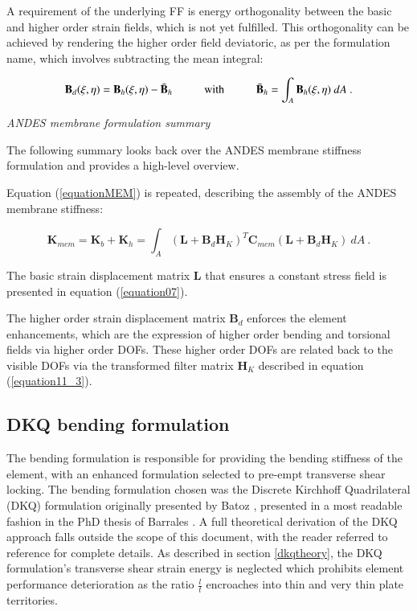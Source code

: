 A requirement of the underlying FF is energy orthogonality between the basic and higher order strain fields, which is not yet fulfilled. This orthogonality can be achieved by rendering the higher order field deviatoric, as per the formulation name, which involves subtracting the mean integral:

\begin{equation} 
\mathbf{B}_d(\xi,\eta) = \mathbf{B}_h(\xi,\eta) - \bar{\mathbf{B}}_h
\hspace{10mm}
\text{with}
\hspace{10mm}
\bar{\mathbf{B}}_h = \int_A \mathbf{B}_h(\xi,\eta) \ dA
\label{eqnAndesDevB}\ .
\end{equation}

\textit{ANDES membrane formulation summary}

The following summary looks back over the ANDES membrane stiffness formulation and provides a high-level overview.

Equation (\ref{equationMEM}) is repeated, describing the assembly of the ANDES membrane stiffness:

\begin{equation} 
\mathbf{K}_{mem} = \mathbf{K}_{b} + \mathbf{K}_{h} = \int_A (\mathbf{L} + \mathbf{B}_d  \mathbf{H}_K)^T \mathbf{C}_{mem} (\mathbf{L} + \mathbf{B}_d \mathbf{H}_K)\ dA
\label{equationMEM_1}\ .
\end{equation}

The basic strain displacement matrix $\mathbf{L}$ that ensures a constant stress field is presented in equation (\ref{equation07}).

The higher order strain displacement matrix $\mathbf{B}_d$ enforces the element enhancements, which are the expression of higher order bending and torsional fields via higher order DOFs. These higher order DOFs are related back to the visible DOFs via the transformed filter matrix $\mathbf{H}_K$ described in equation (\ref{equation11_3}).

\subsection{DKQ bending formulation}
\label{section:DKQ bending formulation}

The bending formulation is responsible for providing the bending stiffness of the element, with an enhanced formulation selected to pre-empt transverse shear locking. The bending formulation chosen was the Discrete Kirchhoff Quadrilateral (DKQ) formulation  originally presented by Batoz \cite{Bat82}, presented in a most readable fashion in the PhD thesis of Barrales \cite{Bar12}. A full theoretical derivation of the DKQ approach falls outside the scope of this document, with the reader referred to reference \cite{Bat82} for complete details. As described in section \ref{dkqtheory}, the DKQ formulation's transverse shear strain energy is neglected which prohibits element performance deterioration as the ratio $\frac{l}{t}$ encroaches into thin and very thin plate territories.

